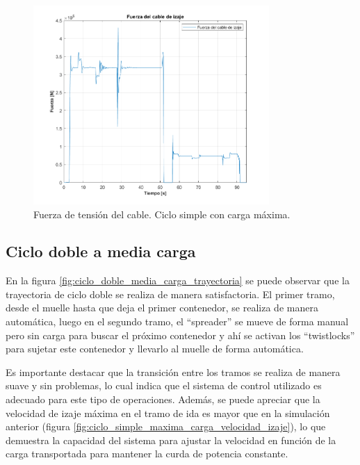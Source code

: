 \documentclass[11pt]{article}
\begin{document}
\begin{figure}%
	\centering
	\includegraphics[width=0.8\textwidth]{images/ciclo_simple_maxima_carga/FuerzadeIzaje.png}
	\caption{Fuerza de tensión del cable. Ciclo simple con carga máxima.}
	\label{fig:ciclo_simple_maxima_carga_fza_cable}
\end{figure}

\subsection{Ciclo doble a media carga}

En la figura \ref{fig:ciclo_doble_media_carga_trayectoria} se puede observar que la trayectoria de ciclo doble se realiza de manera satisfactoria. El primer tramo, desde el muelle hasta que deja el primer contenedor, se realiza de manera automática, luego en el segundo tramo, el ``spreader'' se mueve de forma manual pero sin carga para buscar el próximo contenedor y ahí se activan los ``twistlocks'' para sujetar este contenedor y llevarlo al muelle de forma automática.

Es importante destacar que la transición entre los tramos se realiza de manera suave y sin problemas, lo cual indica que el sistema de control utilizado es adecuado para este tipo de operaciones. Además, se puede apreciar que la velocidad de izaje máxima en el tramo de ida es mayor que en la simulación anterior (figura \ref{fig:ciclo_simple_maxima_carga_velocidad_izaje}), lo que demuestra la capacidad del sistema para ajustar la velocidad en función de la carga transportada para mantener la curda de potencia constante.
\end{document}
